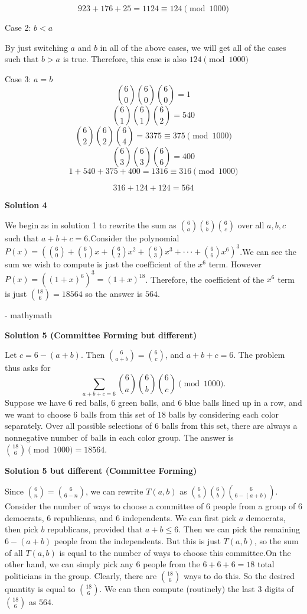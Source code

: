 \begin{enumerate}
 \[923+176+25=1124\equiv124\pmod{1000}\]

 Case 2: $b<a$

 By just switching $a$ and $b$ in all of the above cases, we will get all of the cases such that $b>a$ is true. Therefore, this case is also $124\pmod{1000}$

 Case 3: $a=b$
 \[\binom{6}{0}\binom{6}{0}\binom{6}{0}=1\]
 \[\binom{6}{1}\binom{6}{1}\binom{6}{2}=540\]
 \[\binom{6}{2}\binom{6}{2}\binom{6}{4}=3375\equiv375\pmod{1000}\]
 \[\binom{6}{3}\binom{6}{3}\binom{6}{6}=400\]
 \[1+540+375+400=1316\equiv316\pmod{1000}\]

 \[316+124+124=\boxed{\boxed{564}}\]




\textbf{Solution 4}

We begin as in solution 1 to rewrite the sum as $\binom{6}{a} \binom{6}{b} \binom{6}{c}$ over all $a,b,c$ such that $a+b+c=6$.Consider the polynomial $P(x)=\left(\binom{6}{0} + \binom{6}{1}x + \binom{6}{2}x^2 + \binom{6}{3}x^3 + \cdot \cdot \cdot + \binom{6}{6}x^6\right)^3$.We can see the sum we wish to compute is just the coefficient of the $x^6$ term. However $P(x)=((1+x)^6)^3=(1+x)^{18}$. Therefore, the coefficient of the $x^6$ term is just $\binom{18}{6} = 18564$ so the answer is $\boxed{564}$.

 - mathymath

 



\textbf{Solution 5 (Committee Forming but different)}

Let $c=6-(a+b)$. Then $\binom{6}{a+b}=\binom{6}{c}$, and $a+b+c=6$. The problem thus asks for 
 \[\sum_{a+b+c=6}\binom{6}{a}\binom{6}{b}\binom{6}{c} \pmod {1000}.\] Suppose we have $6$ red balls, $6$ green balls, and $6$ blue balls lined up in a row, and we want to choose $6$ balls from this set of $18$ balls by considering each color separately. Over all possible selections of $6$ balls from this set, there are always a nonnegative number of balls in each color group. The answer is $\binom{18}{6} \pmod {1000}=18\boxed{564}$.

 



\textbf{Solution 5 but different (Committee Forming)}

Since $\binom{6}{n}=\binom{6}{6-n}$, we can rewrite $T(a,b)$ as $\binom{6}{a}\binom{6}{b}\binom{6}{6-(a+b)}$. Consider the number of ways to choose a committee of 6 people from a group of 6 democrats, 6 republicans, and 6 independents. We can first pick $a$ democrats, then pick $b$ republicans, provided that $a+b \leq 6$. Then we can pick the remaining $6-(a+b)$ people from the independents. But this is just $T(a,b)$, so the sum of all $T(a,b)$ is equal to the number of ways to choose this committee.On the other hand, we can simply pick any 6 people from the $6+6+6=18$ total politicians in the group. Clearly, there are $\binom{18}{6}$ ways to do this. So the desired quantity is equal to $\binom{18}{6}$. We can then compute (routinely) the last 3 digits of $\binom{18}{6}$ as $\boxed{564}$.


\end{enumerate}
